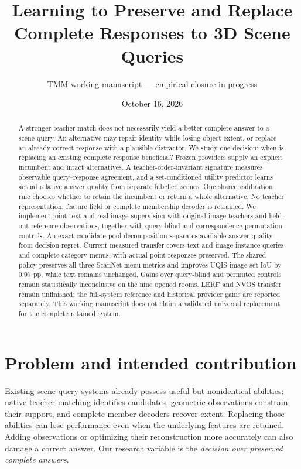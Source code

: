 \documentclass[10pt]{article}
\title{Learning to Preserve and Replace Complete Responses to 3D Scene Queries}
\author{TMM working manuscript --- empirical closure in progress}
\date{October 16, 2026}
\begin{document}
\maketitle
\begin{abstract}
A stronger teacher match does not necessarily yield a better complete answer
to a scene query. An alternative may repair identity while losing object extent,
or replace an already correct response with a plausible distractor. We study
one decision: when is replacing an existing complete response beneficial?
Frozen providers supply an explicit incumbent and intact alternatives. A
teacher-order-invariant signature measures observable query--response agreement,
and a set-conditioned utility predictor learns actual relative answer quality from
separate labelled scenes. One shared calibration rule chooses whether to retain
the incumbent or return a whole alternative. No teacher representation, feature
field or complete membership decoder is retrained. We implement joint text and
real-image supervision with original image teachers and held-out reference
observations, together with query-blind and correspondence-permutation controls.
An exact candidate-pool decomposition separates available answer quality from
decision regret. Current measured transfer covers text and image instance
queries and complete category menus, with actual point responses preserved.
The shared policy preserves all three ScanNet menu metrics and improves UQIS
image set IoU by 0.97 pp, while text remains unchanged. Gains over query-blind and
permuted controls remain statistically inconclusive on the nine opened rooms.
LERF and NVOS transfer remain unfinished; the full-system reference and historical provider
gains are reported separately. This working manuscript does not claim a
validated universal replacement for the complete retained system.
\end{abstract}

\section{Problem and intended contribution}
Existing scene-query systems already possess useful but nonidentical abilities:
native teacher matching identifies candidates, geometric observations constrain
their support, and complete member decoders recover extent. Replacing those
abilities can lose performance even when the underlying features are retained.
Adding observations or optimizing their reconstruction more accurately can also
damage a correct answer. Our research variable is the \emph{decision over
preserved complete answers}.
\end{document}
